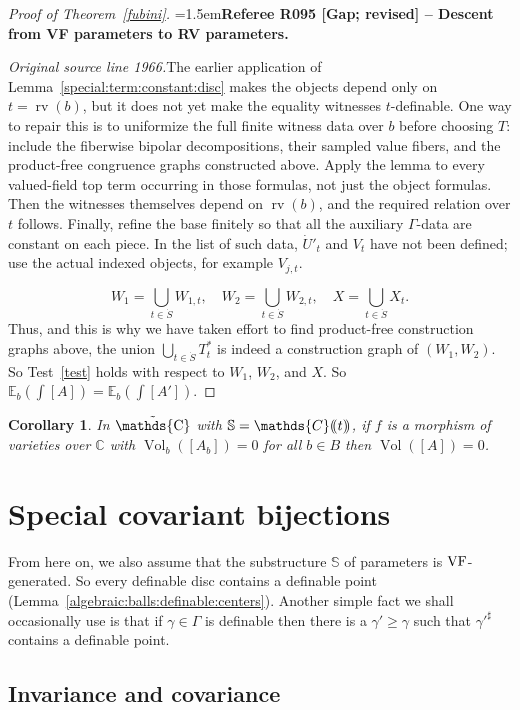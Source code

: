 \documentclass[12pt]{amsart}
\newcommand{\RefereeRemark}[4]{%
  \par\medskip\begingroup\normalfont\small\color{RefereePurple}%
  \emergencystretch=1.5em\noindent\textbf{Referee R#1 [#2] -- #3.}\par\nobreak\noindent #4\par
  \endgroup\medskip
}
\theoremstyle{plain}
\newtheorem{cor}[thm]{Corollary}
\theoremstyle{definition}
\theoremstyle{remark}
\numberwithin{equation}{section}
\theoremstyle{plain}
\newcommand{\VF}{\textup{VF}}
\newcommand{\C}{\mathds{C}}
\newcommand{\0}{\emptyset}
\newcommand{\dpar}[1]{%
   (\mkern-4mu (#1 )\mkern-4mu )}
\newcommand{\bb}[1]{\mathbb{#1}}
\DeclareMathOperator{\rv}{rv}
\DeclareMathOperator{\puC}{\tilde \C}
\DeclareMathOperator{\Vol}{Vol}
\begin{document}
\begin{proof}[Proof of Theorem~\ref{fubini}]
\RefereeRemark{095}{Gap; revised}{Descent from VF parameters to RV parameters}{%
\textit{Original source line 1966.}\quad The earlier application of Lemma~\ref{special:term:constant:disc} makes the objects depend only on $t=\rv(b)$, but it does not yet make the equality witnesses $t$-definable. One way to repair this is to uniformize the full finite witness data over $b$ before choosing $T$: include the fiberwise bipolar decompositions, their sampled value fibers, and the product-free congruence graphs constructed above. Apply the lemma to every valued-field top term occurring in those formulas, not just the object formulas. Then the witnesses themselves depend on $\rv(b)$, and the required relation over $t$ follows. Finally, refine the base finitely so that all the auxiliary $\Gamma$-data are constant on each piece. In the list of such data, $\dot U'_t$ and $V_t$ have not been defined; use the actual indexed objects, for example $V_{j,t}$.
}
\[
W_1 = \bigcup_{t \in \dot S} W_{1,t}, \quad W_2 = \bigcup_{t \in \dot S} W_{2,t}, \quad X = \bigcup_{t \in \dot S} X_t.
\]
Thus, and this is why we have taken effort to find product-free construction graphs above, the union $\bigcup_{t \in \dot S} T^*_t$ is indeed a construction graph of $(W_1, W_2)$. So Test~\ref{test} holds with respect to $W_1$, $W_2$, and $X$. So $\bb E_b (\int [A]) = \bb E_b ( \int [A'])$.
\end{proof}



\begin{cor}
In $\puC$ with $\bb S = \C \dpar{ t }$, if $f$ is a morphism of varieties over $\C$ with $\Vol_b([A_b]) = 0$ for all $b \in B$ then $\Vol([A]) = 0$.
\end{cor}

\section{Special covariant bijections}\label{sec-pscb}


From here on, we also assume that the substructure $\mathbb{S}$ of parameters is $\VF$-generated. So every definable disc contains a definable point (Lemma~\ref{algebraic:balls:definable:centers}). Another simple fact we shall occasionally use is that if $\gamma \in \Gamma$ is definable then there is a $\gamma' \geq \gamma$ such that $\gamma'^\sharp$ contains a definable point.

\subsection{Invariance and covariance}\label{sec:inv:cov}
\end{document}
